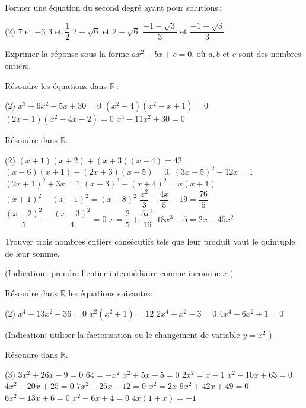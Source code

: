 \documentclass[a4paper,12pt]{report}
\begin{document}



\begin{exo}[2]
Former une équation du second degré ayant pour solutions\,:
\begin{tasks}(2)
\task $7$ et $-3$
\task $3$ et $\dfrac{1}{2}$
\task $2+\sqrt{6}$ et $2-\sqrt{6}$
\task $\dfrac{-1-\sqrt{3}}{3}$ et $\dfrac{-1+\sqrt{3}}{3}$
\end{tasks}	
Exprimer la réponse sous la forme $a x^2+b x+c=0$, où $a, b$ et $c$ sont des nombres entiers.
\end{exo}

\begin{exo}[2]
Résoudre les équations dans $\mathbb{R}$\,:
\begin{tasks}(2)
\task $x^3-6 x^2-5 x+30=0$
\task $\left(x^2+4\right)\left(x^2-x+1\right)=0$
\task $(2 x-1)\left(x^2-4 x-2\right)=0$
\task $x^4-11 x^2+30=0$
\end{tasks}
\end{exo}



\begin{exo}[3]
Résoudre dans $\mathbb{R}$.
\begin{tasks}(2)
\task $(x+1)(x+2)+(x+3)(x+4)=42$
\task $(x-6)(x+1)-(2 x+3)(x-5)=0$.
\task $(3 x-5)^2-12 x=1$
\task $(2 x+1)^2+3 x=1$
\task $(x-3)^2+(x+4)^2=x(x+1)$
\task $(x+1)^2-(x-1)^2=(x-8)^2$
\task $\dfrac{x^2}{3}+\dfrac{4 x}{5}-19=\dfrac{76}{5}$
\task $\dfrac{(x-2)^2}{5}-\dfrac{(x-3)^2}{4}=0$
\task $x=\dfrac{2}{5}+\dfrac{5 x^2}{16}$
\task $18 x^3-5=2 x-45 x^2$
\end{tasks}
\end{exo}

\begin{exo}[2]
Trouver trois nombres entiers consécutifs tels que leur produit vaut le quintuple de leur somme.

(Indication\,: prendre l'entier intermédiaire comme inconnue $x$.)
\end{exo}

\begin{exo}[3]
Résoudre dans $\mathbb{R}$ les équations suivantes:
\begin{tasks}(2)
\task $x^4-13 x^2+36=0$
\task $x^2\left(x^2+1\right)=12$
\task $2 x^4+x^2-3=0$
\task $4 x^4-6 x^2+1=0$
\end{tasks}
(Indication: utiliser la factorisation ou le changement de variable $y=x^2$ )
\end{exo}
\begin{exo}
Résoudre dans $\mathbb{R}$.
\begin{tasks}(3)
\task $3 x^2+26 x-9=0$
\task $64=-x^2$
\task $x^2+5 x-5=0$
\task $2 x^2=x-1$
\task $x^2-10 x+63=0$
\task $4 x^2-20 x+25=0$
\task $7 x^2+25 x-12=0$
\task $x^2=2 x$
\task $9 x^2+42 x+49=0$
\task $6 x^2-13 x+6=0$
\task $x^2-6 x+4=0$
\task $4 x(1+x)=-1$
\end{tasks}
\end{exo}
\end{document}
